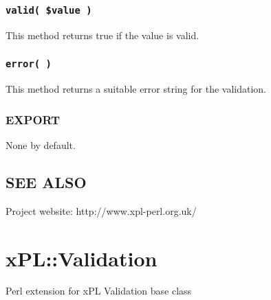 \documentclass[12pt,a4paper]{article}
\begin{document}
\subsubsection*{\texttt{valid( \$value )}\label{xPL::Validation::Pattern_valid_value_}}


This method returns true if the value is valid.

\subsubsection*{\texttt{error( )}\label{xPL::Validation::Pattern_error_}}


This method returns a suitable error string for the validation.

\subsubsection*{EXPORT\label{xPL::Validation::Pattern_EXPORT}}


None by default.

\subsection*{SEE ALSO\label{xPL::Validation::Pattern_SEE_ALSO}}


Project website: http://www.xpl-perl.org.uk/

\newpage
\section{xPL::Validation\label{xPL::Validation}}


Perl extension for xPL Validation base class
\end{document}
